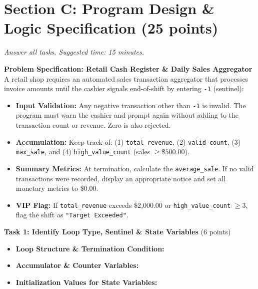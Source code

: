 \documentclass[11pt,a4paper]{article}
\begin{document}
\newpage


\section*{Section C: Program Design \& Logic Specification \hfill \normalsize\normalfont(25 points)}
\textit{Answer all tasks. Suggested time: 15 minutes.}

\begin{tcolorbox}[colback=boxbg,colframe=secondaryteal,arc=1.5mm,boxrule=0.6pt,top=1.5mm,bottom=1.5mm]
\textbf{Problem Specification: Retail Cash Register \& Daily Sales Aggregator}\\[0.5mm]
\small
A retail shop requires an automated sales transaction aggregator that processes invoice amounts until the cashier signals end-of-shift by entering \texttt{-1} (sentinel):
\begin{itemize}[itemsep=0.5pt,topsep=0.5pt]
  \item \textbf{Input Validation:} Any negative transaction other than \texttt{-1} is invalid. The program must warn the cashier and prompt again without adding to the transaction count or revenue. Zero is also rejected.
  \item \textbf{Accumulation:} Keep track of: (1) \texttt{total\_revenue}, (2) \texttt{valid\_count}, (3) \texttt{max\_sale}, and (4) \texttt{high\_value\_count} (sales $\ge \$500.00$).
  \item \textbf{Summary Metrics:} At termination, calculate the \texttt{average\_sale}. If no valid transactions were recorded, display an appropriate notice and set all monetary metrics to \$0.00.
  \item \textbf{VIP Flag:} If \texttt{total\_revenue} exceeds \$2,000.00 or \texttt{high\_value\_count} $\ge 3$, flag the shift as \texttt{"Target Exceeded"}.
\end{itemize}
\end{tcolorbox}

\vspace{0.5mm}
\textbf{Task 1: Identify Loop Type, Sentinel \& State Variables} (6 points)
\begin{itemize}[leftmargin=2em]
  \item \textbf{Loop Structure \& Termination Condition:} \hrulefill\\[3mm]
  \item \textbf{Accumulator \& Counter Variables:} \hrulefill\\[3mm]
  \item \textbf{Initialization Values for State Variables:} \hrulefill
\end{itemize}
\end{document}
